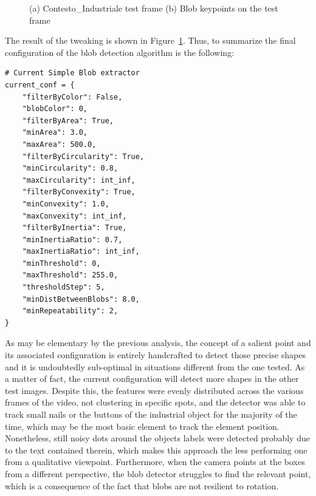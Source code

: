 \documentclass[journal]{IEEEtran}
\begin{document}
\begin{figure}
\centering
    \caption{(a) Contesto_Industriale test frame (b) Blob keypoints on the test frame}
    \label{fig:blob}
\end{figure}

The result of the tweaking is shown in Figure~\ref{fig:blob}. Thus, to summarize the final configuration of the blob detection algorithm is the following:

\begin{verbatim}
# Current Simple Blob extractor
current_conf = {
    "filterByColor": False,
    "blobColor": 0,
    "filterByArea": True,
    "minArea": 3.0,
    "maxArea": 500.0,
    "filterByCircularity": True,
    "minCircularity": 0.8,
    "maxCircularity": int_inf,
    "filterByConvexity": True,
    "minConvexity": 1.0,
    "maxConvexity": int_inf,
    "filterByInertia": True,
    "minInertiaRatio": 0.7,
    "maxInertiaRatio": int_inf,
    "minThreshold": 0,
    "maxThreshold": 255.0,
    "thresholdStep": 5,
    "minDistBetweenBlobs": 8.0,
    "minRepeatability": 2,
}
\end{verbatim}

As may be elementary by the previous analysis, the concept of a salient point and its associated configuration is entirely handcrafted to detect those precise shapes and it is undoubtedly sub-optimal in situations different from the one tested. As a matter of fact, the current configuration will detect more shapes in the other test images. Despite this, the features were evenly distributed across the various frames of the video, not clustering in specific spots, and the detector was able to track small nails or the buttons of the industrial object for the majority of the time, which may be the most basic element to track the element position. Nonetheless, still noisy dots around the objects labels were detected probably due to the text contained therein, which makes this approach the less performing one from a qualitative viewpoint. Furthermore, when the camera points at the boxes from a different perspective, the blob detector struggles to find the relevant point, which is a consequence of the fact that blobs are not resilient to rotation.
\end{document}
